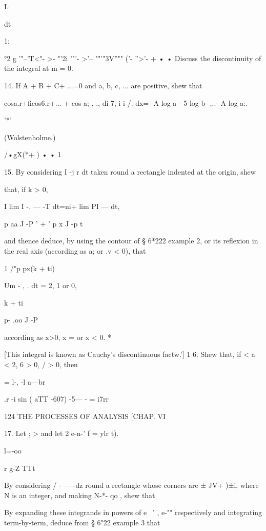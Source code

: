 L 



dt 



1: 



°2 g  '"--'T<"- >- "'2i '"'- >'-- ""'"3V''"" ('- ''>'- + •   • 
Discuss the discontinuity of the integral at m = 0. 

14. If A + B + C+ ...=0 and a, b, c, ... are positive, shew that 

 cosa.r+ficos6.r+... +  cos a; , ., di 7, i-i /. 
dx= -A log a - 5 log b- ,..- A log a:. 

'*' 

(Wolstenholme.) 

/•gX(*+ ) • • 1 

15. By considering I -j r dt taken round a rectangle indented at the origin, shew 

that, if k > 0, 

I lim I -. — -T dt=ni+ lim PI — dt, 

p aa J -P  ' + '  p x J -p t 

and thence deduce, by using the contour of § 6*222 example 2, or its reflexion in the real 
axis (according as a;   or .v < 0), that 



1 /"p px(k + ti) 

Um - , . dt = 2, 1 or 0, 



k + ti 



p- .oo   J -P 

according as x>0, x = or x < 0. * 

[This integral is known as Cauchy's discontinuous factw.'] 
1 6. Shew that, if < a < 2, 6 > 0, /  > 0, then 

= l-,  -l a—br 



.r -i sin ( aTT -607) -5—  -  = i7rr  



124 THE PROCESSES OF ANALYSIS [CHAP. VI 

17. Let  ; > and let 2 e-n-' f = ylr t). 

 l=-oo 

r g-Z TTt 

By considering / -  — -dz round a rectangle whose corners are ± JV+ )±i, where 
N is an integer, and making N-*- qo , shew that 

By expanding these integrands in powers of e~ ' , e-""  respectively and integrating 
term-by-term, deduce from § 6"22 example 3 that 

